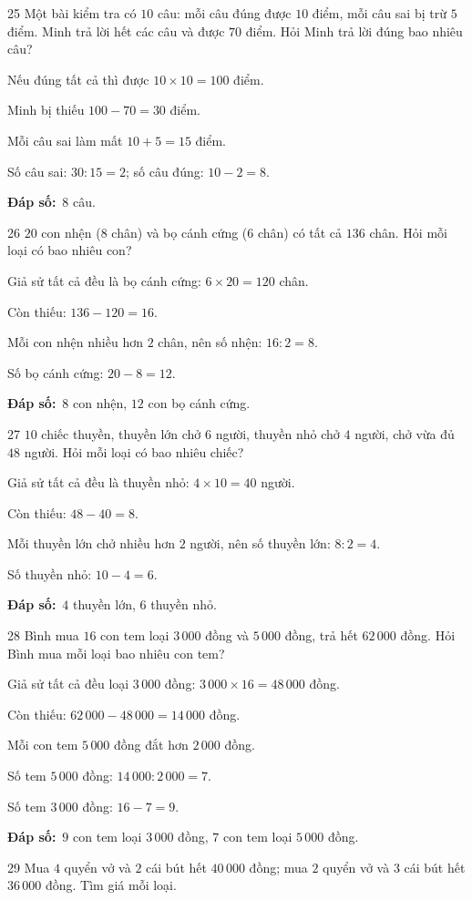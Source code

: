 \documentclass[11pt]{article}
\newif\ifsol \solfalse
\providecommand{\AnsWord}{Đáp số}
\newcommand{\dapso}[1]{\par\textbf{\AnsWord:}\ #1}
\newcommand{\probsol}[1]{%
  \begin{lrbox}{\solmeasure}\begin{minipage}{\dimexpr\linewidth-24pt\relax}#1\end{minipage}\end{lrbox}%
  \ifsol
    \begin{solbox}#1\end{solbox}%
  \else
    \setlength{\solht}{\dimexpr\ht\solmeasure+\dp\solmeasure+0.85cm\relax}%
    \ifdim\solht<1.35cm\setlength{\solht}{1.35cm}\fi
    \begin{tcolorbox}[colback=white,colframe=Line,boxrule=0.8pt,arc=5pt,
      left=8pt,right=8pt,top=4pt,bottom=4pt,height=\solht]{\footnotesize\color{Slate}\itshape\WorkWord}\end{tcolorbox}%
  \fi}
\newcommand{\gap}{\vspace{0.3cm}}
\def\WorkWord{Bài làm:}
\def\AnsWord{Đáp số}
\begin{document}
\gap
\begin{probbox}{25}{\relax}
Một bài kiểm tra có $10$ câu: mỗi câu đúng được $10$ điểm, mỗi câu sai bị trừ $5$ điểm. Minh trả lời hết các câu và được $70$ điểm. Hỏi Minh trả lời đúng bao nhiêu câu?
\end{probbox}
\probsol{
Nếu đúng tất cả thì được $10\times10=100$ điểm.\par Minh bị thiếu $100-70=30$ điểm.\par Mỗi câu sai làm mất $10+5=15$ điểm.\par Số câu sai: $30:15=2$; số câu đúng: $10-2=8$.
\dapso{$8$ câu.}}
\gap
\begin{probbox}{26}{\relax}
$20$ con nhện ($8$ chân) và bọ cánh cứng ($6$ chân) có tất cả $136$ chân. Hỏi mỗi loại có bao nhiêu con?
\end{probbox}
\probsol{
Giả sử tất cả đều là bọ cánh cứng: $6\times20=120$ chân.\par Còn thiếu: $136-120=16$.\par Mỗi con nhện nhiều hơn $2$ chân, nên số nhện: $16:2=8$.\par Số bọ cánh cứng: $20-8=12$.
\dapso{$8$ con nhện, $12$ con bọ cánh cứng.}}
\gap
\begin{probbox}{27}{\relax}
$10$ chiếc thuyền, thuyền lớn chở $6$ người, thuyền nhỏ chở $4$ người, chở vừa đủ $48$ người. Hỏi mỗi loại có bao nhiêu chiếc?
\end{probbox}
\probsol{
Giả sử tất cả đều là thuyền nhỏ: $4\times10=40$ người.\par Còn thiếu: $48-40=8$.\par Mỗi thuyền lớn chở nhiều hơn $2$ người, nên số thuyền lớn: $8:2=4$.\par Số thuyền nhỏ: $10-4=6$.
\dapso{$4$ thuyền lớn, $6$ thuyền nhỏ.}}
\gap
\begin{probbox}{28}{\relax}
Bình mua $16$ con tem loại $3\,000$ đồng và $5\,000$ đồng, trả hết $62\,000$ đồng. Hỏi Bình mua mỗi loại bao nhiêu con tem?
\end{probbox}
\probsol{
Giả sử tất cả đều loại $3\,000$ đồng: $3\,000\times16=48\,000$ đồng.\par Còn thiếu: $62\,000-48\,000=14\,000$ đồng.\par Mỗi con tem $5\,000$ đồng đắt hơn $2\,000$ đồng.\par Số tem $5\,000$ đồng: $14\,000:2\,000=7$.\par Số tem $3\,000$ đồng: $16-7=9$.
\dapso{$9$ con tem loại $3\,000$ đồng, $7$ con tem loại $5\,000$ đồng.}}
\gap
\begin{probbox}{29}{\relax}
Mua $4$ quyển vở và $2$ cái bút hết $40\,000$ đồng; mua $2$ quyển vở và $3$ cái bút hết $36\,000$ đồng. Tìm giá mỗi loại.
\end{probbox}
\end{document}
